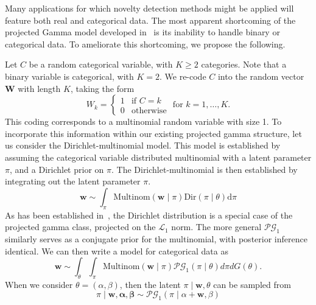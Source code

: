 Many applications for which novelty detection methods might be applied will 
  feature both real and categorical data.   The most apparent 
  shortcoming of the projected Gamma model developed in~\cite{trubey:pg} is
  its inability to handle binary or categorical data.  To ameliorate this 
  shortcoming, we propose the following.

Let $C$ be a random categorical variable, with $K \geq 2$ categories.  Note 
  that a binary variable is categorical, with $K = 2$. We re-code $C$ into the 
  random vector $\bm{W}$ with length $K$, taking the form
  \[
    W_k = \begin{cases}
    1 &\text{if }C = k\\
    0 &\text{otherwise}
    \end{cases} \text{ for }k = 1,\ldots, K.
  \]
  This coding corresponds to a multinomial random variable with size 1. To 
  incorporate this information within our existing projected gamma structure, 
  let us consider the Dirichlet-multinomial model.  This model is established by
  assuming the categorical variable distributed multinomial with a latent 
  parameter $\pi$, and a Dirichlet prior on $\pi$. The Dirichlet-multinomial is 
  then established by integrating out the latent parameter $\pi$. 
  \[
    \bm{w} \sim \int_{\pi} \text{Multinom}(\bm{w}\mid\pi)\text{Dir}(\pi\mid\theta)\text{d}\pi
  \]
  As has been established in~\cite{trubey:pg}, the Dirichlet distribution is a 
  special case of the projected gamma class, projected on the $\mathcal{L}_1$ 
  norm.  The more general $\mathcal{PG}_1$ similarly serves as a conjugate prior 
  for the multinomial, with posterior inference identical.  We can then write a 
  model for categorical data as
  \begin{equation}
    \label{model:cat}
    \bm{w} \sim \int_{\theta}\int_{\pi}\text{Multinom}(\bm{w}\mid \pi)
                              \mathcal{PG}_1(\pi\mid \theta)d\pi dG(\theta).
  \end{equation}
  When we consider $\theta = (\alpha,\beta)$, then the latent 
  $\pi\mid \bm{w},\theta$ can be sampled from
  \begin{equation}
    \label{eqn:pifc}
    \pi\mid \bm{w},\bm{\alpha},\bm{\beta} \sim \mathcal{PG}_1(\pi\mid\alpha + \bm{w}, \beta)
  \end{equation}

